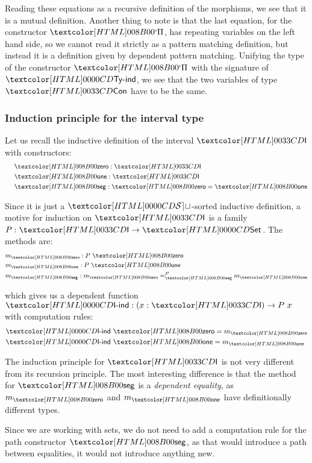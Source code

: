 Reading these equations as a recursive definition of the morphisms, we
see that it is a mutual definition. Another thing to note is that the
last equation, for the constructor $\ttpi$, has repeating variables on
the left hand side, so we cannot read it strictly as a pattern
matching definition, but instead it is a definition given by dependent
pattern matching. Unifying the type of the constructor $\ttpi$ with
the signature of $\tttyind$, we see that the two variables of type
$\ttconty$ have to be the same.

\subsubsection{Induction principle for the interval type}

Let us recall the inductive definition of the interval $\intty$ with
constructors:
\begin{align*}
  \constr{\intzero}{\intty} \\
  \constr{\intone}{\intty} \\
  \constr{\intseg}{\intzero = \intone}
\end{align*}

Since it is just a $\SET$-sorted inductive definition, a motive for
induction on $\intty$ is a family $P : \intty \to \Set$. The methods
are:
\begin{align*}
  &m_{\intzero} : P\ \intzero \\
  &m_{\intone} : P\ \intone \\
  &m_{\intseg} : \pathover{P}{\intseg}{m_{\intzero}}{m_{\intone}}
\end{align*}

which gives us a dependent function $\intind : (x : \intty) \to P\ x$
with computation rules:
\begin{align*}
  &\intind\ \intzero = m_{\intzero} \\
  &\intind\ \intone = m_{\intone} \\
\end{align*}

The induction principle for $\intty$ is not very different from its
recursion principle. The most interesting difference is that the
method for $\intseg$ is a \emph{dependent equality}, as $m_{\intzero}$
and $m_{\intone}$ have definitionally different types.

Since we are working with sets, we do not need to add a computation
rule for the path constructor $\intseg$, as that would introduce a
path between equalities, \ie it would not introduce anything new.

